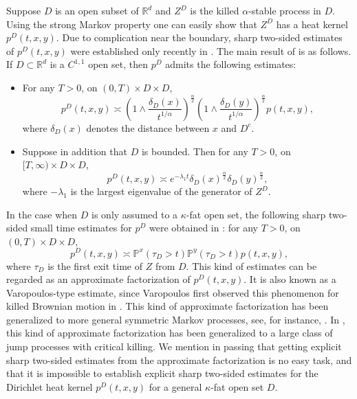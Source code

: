 \documentclass[12pt,a4paper]{amsart}
\numberwithin{equation}{section}
\theoremstyle{plain}
\newcommand{\mb}{\mathbb}
\newcommand{\1}{\mathbbm{1}}
\begin{document}
Suppose $D$ is an open subset of $\mb{R}^d$ and $Z^D$ is the killed $\alpha$-stable process in $D$. Using the strong Markov property one can easily show that $Z^D$ has a heat kernel $p^{D}(t,x,y)$. Due to complication near the boundary, sharp two-sided estimates of $p^{D}(t,x,y)$ were established only recently in \cite{CKS10}. The main result of \cite{CKS10} is as follows. 
If $D\subset \mb{R}^d$ is a $C^{1,1}$ open set, then $p^D$ admits the following estimates:
\begin{itemize}
\item 
For any $T>0$, on $(0,T)\times D \times D$, 
\begin{equation}\label{e:3}
p^{D}(t,x,y) \asymp \left(1 \wedge \frac{\delta_{D}(x)}{t^{1/\alpha}}\right)^{\frac{\alpha}{2}} \left(1 \wedge \frac{\delta_{D}(y)}{t^{1/\alpha}}\right)^{\frac{\alpha}{2}} p(t,x,y),
\end{equation}
where $\delta_D(x)$ denotes the distance between $x$ and $D^c$.
\item 
Suppose in addition that  $D$ is bounded. Then for any $T>0$, on $[T,\infty) \times D \times D$, 
\begin{equation}\label{e:4}
p^{D}(t,x,y) \asymp e^{-\lambda_1 t} \delta_D(x)^{\frac{\alpha}{2}}\delta_D(y)^{\frac{\alpha}{2}},
\end{equation} 
where $-\lambda_1$ is the largest eigenvalue of 
the generator of $Z^D$.
\end{itemize}
In the case when $D$ is only assumed to a $\kappa$-fat open set, 
the following sharp two-sided small time estimates for 
$p^D$ were obtained 
in  \cite{Bogdan10}: for any $T>0$, on $(0,T)\times D \times D$,
\begin{equation}\label{factorization type}
p^D(t,x,y)\asymp \mb P^x(\tau_D>t)\mb P^y(\tau_D>t)p(t,x,y),
\end{equation}
where $\tau_D$ is the first exit time of $Z$ from $D$. This kind of estimates can be regarded as an approximate factorization of $p^D(t,x,y)$. It is also known as a Varopoulos-type 
estimate,  since Varopoulos first observed this phenomenon for killed Brownian motion in \cite{Varopoulos03}.
This kind of approximate factorization has been generalized to more general symmetric Markov processes, see, for instance, \cite{CKS14}. 
In \cite{CKSV20}, this kind of approximate factorization has been generalized to a large class of 
 jump processes with critical killing.  We mention in passing that getting explicit sharp two-sided estimates from the 
 approximate factorization
 is no easy task, and that it is impossible to establish explicit sharp two-sided estimates for the Dirichlet heat kernel $p^D(t, x, y)$ for a general $\kappa$-fat open set $D$. 
 
\end{document}
